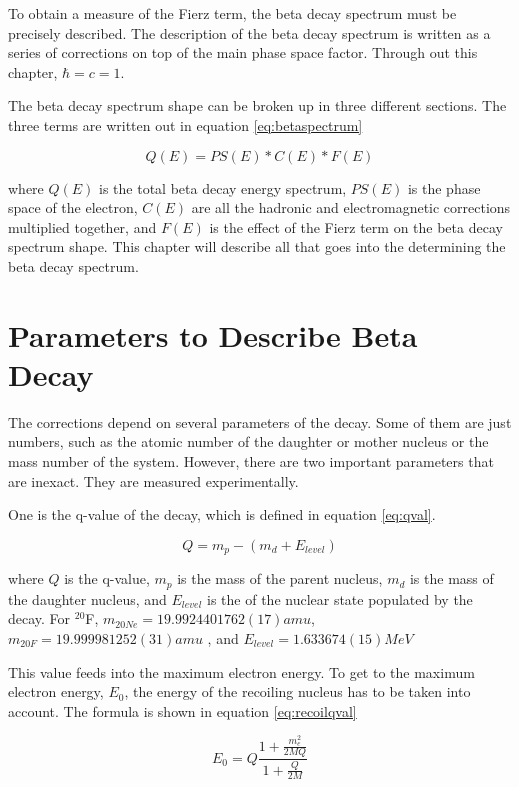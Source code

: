 \documentclass[main.tex]{subfiles}
\begin{document}
To obtain a measure of the Fierz term, the beta decay spectrum must be precisely described.
The description of the beta decay spectrum is written as a series of corrections on top of the main phase space factor.  
Through out this chapter, $\hbar = c = 1$.

The beta decay spectrum shape can be broken up in three different sections.
The three terms are written out in equation \ref{eq:betaspectrum}

\begin{equation}
	Q(E) = PS(E) * C(E) * F(E)
	\label{eq:betaspectrum}
\end{equation}

where $Q(E)$ is the total beta decay energy spectrum, $PS(E)$ is the phase space of the electron, $C(E)$ are all the hadronic and electromagnetic corrections multiplied together, and $F(E)$ is the effect of the Fierz term on the beta decay spectrum shape.
This chapter will describe all that goes into the determining the beta decay spectrum.

\section{Parameters to Describe Beta Decay}
The corrections depend on several parameters of the decay. 
Some of them are just numbers, such as the atomic number of the daughter or mother nucleus or the mass number of the system.
However, there are two important parameters that are inexact.
They are measured experimentally.

One is the q-value of the decay, which is defined in equation \ref{eq:qval}.

\begin{equation}
	Q = m_{p} - (m_{d} + E_{level})
	\label{eq:qval}
\end{equation} 

where $Q$ is the q-value, $m_{p}$ is the mass of the parent nucleus, $m_{d}$ is the mass of the daughter nucleus, and $E_{level}$ is the of the nuclear state populated by the decay. 
For $^{20}$F, $m_{20Ne} = 19.9924401762 (17) amu$, $m_{20F} = 19.999981252 (31) amu$ \cite{Wan17} , and $E_{level} = 1.633674 (15) MeV $ \cite{Til98}    

This value feeds into the maximum electron energy.
To get to the maximum electron energy, $E_{0}$, the energy of the recoiling nucleus has to be taken into account.
The formula is shown in equation \ref{eq:recoilqval}

\begin{equation}
	E_{0} = Q\frac{1 + \frac{m_{e}^{2}}{2MQ}}{1 + \frac{Q}{2M}} 
	\label{eq:recoilqval}
\end{equation} 
\end{document}
